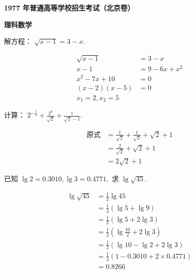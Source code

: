 \documentclass[answers]{exam}
\begin{document}
\begin{center}
	\textbf{\large{1977 年普通高等学校招生考试（北京卷） }}

	\textbf{\LARGE{理科数学}}
\end{center}
\begin{questions}
	\question 解方程： \( \sqrt{x - 1} = 3 - x \).
	\begin{solution}
		\begin{align*}
			\sqrt{x - 1}  & = 3 - x        \\
			x - 1         & = 9 - 6x + x^2 \\
			x^2 - 7x + 10 & = 0            \\
			(x-2)(x-5)    & = 0            \\
			x_1 = 2, x_2 = 5
		\end{align*}
	\end{solution}

	\question 计算： \( 2^{-\frac12} + \frac{2^0}{\sqrt{2}} + \frac{1}{\sqrt{2} - 1}. \)

	\begin{solution}
		\begin{align*}
			\text{原式} & = \frac{1}{\sqrt{2}} + \frac{1}{\sqrt{2}} + \sqrt{2} + 1 \\
			          & = \frac{2}{\sqrt{2}} + \sqrt{2} + 1                      \\
			          & = 2\sqrt{2} + 1
		\end{align*}
	\end{solution}

	\question 已知 \( \lg2 = 0.3010, \lg3 = 0.4771, \) 求 \( \lg\sqrt{45} \).

	\begin{solution}
		\begin{align*}
			\lg\sqrt{45} & = \frac12\lg{45}                        \\
			             & = \frac12(\lg5 + \lg9)                  \\
			             & = \frac12(\lg5 + 2\lg3)                 \\
			             & = \frac12(\lg\frac{10}{2} + 2\lg3)      \\
			             & = \frac12(\lg10 - \lg2 + 2\lg3)         \\
			             & = \frac12(1 - 0.3010 + 2 \times 0.4771) \\
			             & = 0.8266
		\end{align*}
	\end{solution}


\end{questions}
\end{document}
